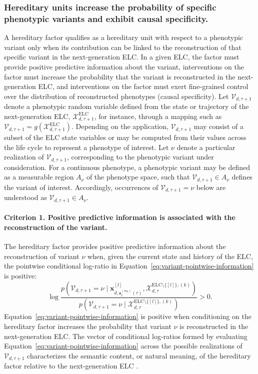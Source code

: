\documentclass[pdflatex,sn-mathphys-num]{sn-jnl}
\theoremstyle{thmstylethree}
\theoremstyle{thmstyleone}
\newcommand{\ELC}{\mathrm{ELC}}
\begin{document}
\subsubsection{Hereditary units increase the probability of specific phenotypic variants and exhibit causal specificity.}
A hereditary factor qualifies as a hereditary unit with respect to a phenotypic variant only when its contribution can be linked to the reconstruction of that specific variant in the next-generation ELC. In a given ELC, the factor must provide positive predictive information about the variant, interventions on the factor must increase the probability that the variant is reconstructed in the next-generation ELC, and interventions on the factor must exert fine-grained control over the distribution of reconstructed phenotypes (causal specificity). Let $\mathcal{V}_{d,\tau+1}$ denote a phenotypic random variable defined from the state or trajectory of the next-generation ELC, $\mathcal{X}_{d,\tau+1}^{\ELC}$, for instance, through a mapping such as  $\mathcal{V}_{d,\tau+1} = g(\mathcal{X}_{d,\tau+1}^{\ELC})$. Depending on the application, $\mathcal{V}_{d,\tau+1}$ may consist of a subset of the ELC state variables or may be computed from their values across the life cycle to represent a phenotype of interest. Let $\nu$ denote a particular realization of $\mathcal{V}_{d,\tau+1}$, corresponding to the phenotypic variant under consideration. For a continuous phenotype, a phenotypic variant may be defined as a measurable region $A_{\nu}$ of the phenotype space, such that $\mathcal{V}_{d,\tau+1} \in A_{\nu}$ defines the variant of interest. Accordingly, occurrences of $\mathcal{V}_{d,\tau+1}=\nu$ below are understood as $\mathcal{V}_{d,\tau+1}\in A_{\nu}$. 

\paragraph{Criterion 1. Positive predictive information is associated with the reconstruction of the variant.}
The hereditary factor provides positive predictive information about the reconstruction of variant $\nu$ when, given the current state and history of the ELC, the pointwise conditional log-ratio in Equation~\eqref{eq:variant-pointwise-information} is positive:
\begin{equation}
\label{eq:variant-pointwise-information}
\log
\frac{
p\!\left(
\mathcal{V}_{d,\tau+1}=\nu
\mid
\mathbf{x}^{[l]}_{d,\mathbf{s}^{(m_l)}_l(\tau)},
\mathcal{X}_{d,\tau}^{\ELC\setminus\{[l]\},(k)}
\right)
}{
p\!\left(
\mathcal{V}_{d,\tau+1}=\nu
\mid
\mathcal{X}_{d,\tau}^{\ELC\setminus\{[l]\},(k)}
\right)
}
>0.
\end{equation}
Equation~\eqref{eq:variant-pointwise-information} is positive when conditioning on the hereditary factor increases the probability that variant $\nu$ is reconstructed in the next-generation ELC. The vector of conditional log-ratios formed by evaluating Equation~\eqref{eq:variant-pointwise-information} across the possible realizations of $\mathcal{V}_{d,\tau+1}$ characterizes the semantic content, or natural meaning, of the hereditary factor relative to the next-generation ELC \cite{isaac2019semantics}.
\end{document}
